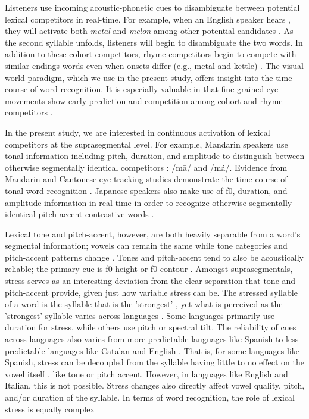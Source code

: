 {Listeners use incoming acoustic-phonetic cues to disambiguate between potential lexical competitors in real-time. For example, when an English speaker hears , they will activate both \textit{metal} and \textit{melon} among other potential candidates \citep{Marslen1980}. As the second syllable unfolds, listeners will begin to disambiguate the two words. In addition to these cohort competitors, rhyme competitors begin to compete with similar endings words even when onsets differ (e.g., metal and kettle) \citep{Allopenna_1998}. The visual world paradigm, which we use in the present study, offers insight into the time course of word recognition. It is especially valuable in that fine-grained eye movements show early prediction and competition among cohort and rhyme competitors \citep{Allopenna_1998}.

In the present study, we are interested in continuous activation of lexical competitors at the suprasegmental level. For example, Mandarin speakers use tonal information including pitch, duration, and amplitude to distinguish between otherwise segmentally identical competitors \citep{Lee2008, Zhang2022, fox_1985}: /m\=a/ and /m\'a/. Evidence from Mandarin and Cantonese eye-tracking studies demonstrate the time course of tonal word recognition \citep{zou_2022, qin_2022, Nixon2016}. Japanese speakers also make use of f0, duration, and amplitude information in real-time in order to recognize otherwise segmentally identical pitch-accent contrastive words \citep{goss_2014, Cutler1999, Ito2024}.

Lexical tone and pitch-accent, however, are both heavily separable from a word's segmental information; vowels can remain the same while tone categories and pitch-accent patterns change \citep{Zeng2017}. Tones and pitch-accent tend to also be acoustically reliable; the primary cue is f0 height or f0 contour \citep{goss_2014}. Amongst suprasegmentals, stress serves as an interesting deviation from the clear separation that tone and pitch-accent provide, given just how variable stress can be. The stressed syllable of a word is the syllable that is the 'strongest' \citep{sluijter1996spectral}, yet what is perceived as the 'strongest' syllable varies across languages \citep{Cutler1988}. Some languages primarily use duration for stress, while others use pitch or spectral tilt. The reliability of cues across languages also varies from more predictable languages like Spanish to less predictable languages like Catalan and English \citep{ortega_2011, beckman_1994}. That is, for some languages like Spanish, stress can be decoupled from the syllable having little to no effect on the vowel itself \citep{ortega_2011}, like tone or pitch accent. However, in languages like English and Italian, this is not possible. Stress changes also directly affect vowel quality, pitch, and/or duration of the syllable. In terms of word recognition, the role of lexical stress is equally complex \citep{cutler2001voornaam, Reinisch2010}

}
